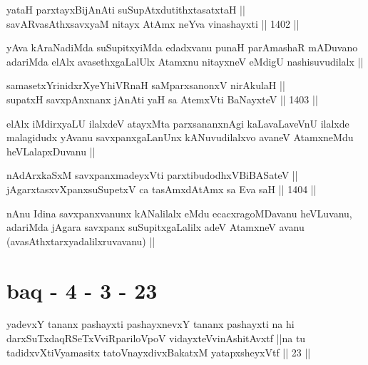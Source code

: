 
\begin{shl}
yataH parxtayxBijAnAti suSupAtxdutithxtasatxtaH || \\
savARvasAthxsavxyaM nitayx AtAmx neYva vinashayxti \hfill || 1402 ||  
\end{shl}

\begin{artha}
yAva kAraNadiMda suSupitxyiMda edadxvanu punaH parAmashaR mADuvano adariMda elAlx avasethxgaLalUlx Atamxnu nitayxneV eMdigU nashisuvudilalx ||
\end{artha}


\begin{shl}
samasetxYrinidxrXyeYhiVRnaH saMparxsanonxV nirAkulaH ||  \\
supatxH savxpAnxnanx jAnAti yaH sa AtemxVti BaNayxteV \hfill || 1403 ||  
\end{shl}

\begin{artha}
elAlx iMdirxyaLU ilalxdeV atayxMta parxsananxnAgi kaLavaLaveVnU ilalxde malagidudx yAvanu savxpanxgaLanUnx kANuvudilalxvo avaneV AtamxneMdu heVLalapxDuvanu ||
\end{artha}


\begin{shl}
nAdArxkaSxM savxpanxmadeyxVti parxtibudodhxV\s BiBASateV ||  \\
jAgarxtasxvXpanxsuSupetxV ca tasAmxdAtAmx sa Eva saH \hfill || 1404 ||  
\end{shl}

\begin{artha}
nAnu Idina savxpanxvanunx kANalilalx eMdu ecacxragoMDavanu heVLuvanu, adariMda jAgara savxpanx suSupitxgaLalilx adeV AtamxneV avanu (avasAthxtarxyadalilxruvavanu) ||
\end{artha}

\section*{baq - 4 - 3 - 23}

\begin{shl}
yadevxY tananx pashayxti pashayxnevxY tananx pashayxti na hi darxSuTxdaqRSeTxVviRpariloVpoV vidayxteV\s vinAshitAvxtf ||na tu tadidxvXtiVyamasitx tatoV\s nayxdivxBakatxM yatapxsheyxVtf || 23 ||
\end{shl}

